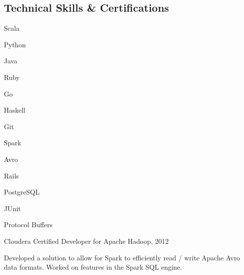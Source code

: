 \documentclass[a4paper,margin,line]{resume}
\begin{document}
\begin{resume}
\section{\mysidestyle Technical Skills \& Certifications}
	\begin{compactdesc}
		\item[Languages] \begin{inparaenum} { \small
            \item Scala
			\item Python
			\item Java
			\item Ruby
			\item Go
            \item Haskell
		} \end{inparaenum}
		\item[Tools] \begin{inparaenum} { \small
			\item Git
            \item Spark
            \item Avro
            \item Rails
            \item PostgreSQL
            \item JUnit
            \item Protocol Buffers
		} \end{inparaenum}
        \item[Certifications] \begin{inparaenum} { \small
            \item Cloudera Certified Developer for Apache Hadoop, 2012    
        } \end{inparaenum}
        \item[Apache Spark Contributor] Developed a solution to allow for Spark to efficiently read
            / write Apache Avro data formats. Worked on features in the Spark SQL engine.
	\end{compactdesc}


\end{resume}
\end{document}
